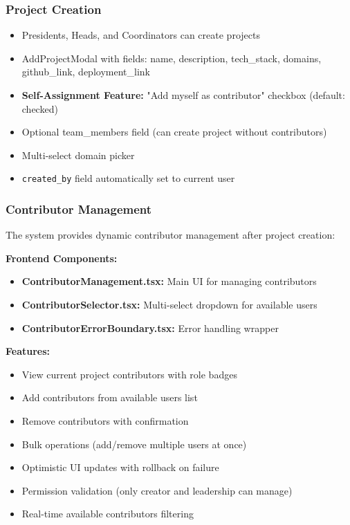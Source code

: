 \documentclass[11pt,a4paper]{article}
\begin{document}
\subsubsection{Project Creation}
\begin{itemize}[leftmargin=*]
    \item Presidents, Heads, and Coordinators can create projects
    \item AddProjectModal with fields: name, description, tech\_stack, domains, github\_link, deployment\_link
    \item \textbf{Self-Assignment Feature:} "Add myself as contributor" checkbox (default: checked)
    \item Optional team\_members field (can create project without contributors)
    \item Multi-select domain picker
    \item \texttt{created\_by} field automatically set to current user
\end{itemize}

\subsubsection{Contributor Management}
The system provides dynamic contributor management after project creation:

\textbf{Frontend Components:}
\begin{itemize}[leftmargin=*]
    \item \textbf{ContributorManagement.tsx:} Main UI for managing contributors
    \item \textbf{ContributorSelector.tsx:} Multi-select dropdown for available users
    \item \textbf{ContributorErrorBoundary.tsx:} Error handling wrapper
\end{itemize}

\textbf{Features:}
\begin{itemize}[leftmargin=*]
    \item View current project contributors with role badges
    \item Add contributors from available users list
    \item Remove contributors with confirmation
    \item Bulk operations (add/remove multiple users at once)
    \item Optimistic UI updates with rollback on failure
    \item Permission validation (only creator and leadership can manage)
    \item Real-time available contributors filtering
\end{itemize}
\end{document}

